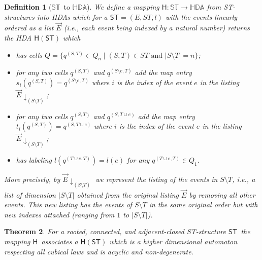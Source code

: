 \documentclass[submission,copyright,creativecommons]{eptcs}
\newtheorem{theorem}{Theorem}[section]
\newtheorem{definition}[theorem]{Definition}
\newcommand\evlist[1]{\ensuremath{\overrightarrow{#1}}}
\newcommand\ST{\ensuremath{\mathsf{ST}}}
\newcommand\allST{\ensuremath{\mathbb{ST}}}
\newcommand\allHDA{\ensuremath{\mathbb{HDA}}}
\newcommand\stintoh{\ensuremath{\mathsf{H}}}
\begin{document}
\begin{definition}[\allST\ to \allHDA]\label{def_STtoHDA}
We define a mapping $\stintoh:\allST\rightarrow\allHDA$ from ST-structures into HDAs which for a $\ST=(E,ST,l)$ with the events linearly ordered as a list $\evlist{E}$ (i.e., each event being indexed by a natural number) returns the HDA $\stintoh(\ST)$ which
\begin{itemize}
\item has cells $Q=\{q^{(S,T)}\in Q_{n} \mid (S,T)\in ST \mbox{ and } |S\setminus T|=n\}$;

\item for any two cells $q^{(S,T)}$ and $q^{(S\setminus e,T)}$ add the map entry $s_{i}(q^{(S,T)})=q^{(S\setminus e,T)}$ where $i$ is the index of the event $e$ in the listing $\evlist{E}\!\!\downarrow_{(S\setminus T)}$;

\item for any two cells $q^{(S,T)}$ and $q^{(S,T\cup e)}$ add the map entry $t_{i}(q^{(S,T)})=q^{(S,T\cup e)}$ where $i$ is the index of the event $e$ in the listing $\evlist{E}\!\!\downarrow_{(S\setminus T)}$;

\item has labeling $l(q^{(T\cup e,T)})=l(e)$ for any $q^{(T\cup e,T)}\in Q_{1}$.
\end{itemize}
More precisely, by $\evlist{E}\!\!\downarrow_{(S\setminus T)}$ we represent the listing of the events in $S\setminus T$, i.e., a list of dimension $|S\setminus T|$ obtained from the original listing $\evlist{E}$ by removing all other events. This new listing has the events of $S\setminus T$ in the same original order but with new indexes attached (ranging from $1$ to $|S\setminus T|$).
\end{definition}

\begin{theorem}\label{th_stintohda}
For a rooted, connected, and adjacent-closed ST-structure \ST\ the mapping \stintoh\ associates a $\stintoh(\ST)$ which is a higher dimensional automaton respecting all cubical laws and is acyclic and non-degenerate.
\end{theorem}
\end{document}
